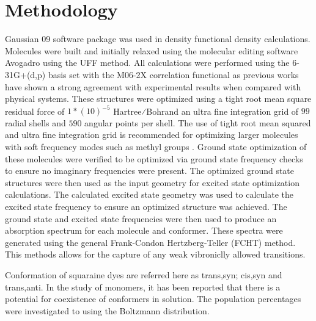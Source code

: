 \documentclass[journal=jacsat,manuscript=article]{achemso}
\begin{document}
\section{Methodology}
Gaussian 09 software package\cite{M.J.FrischG.W.Trucks2016Gaussian09}⁠ was used in density functional density calculations. Molecules were built and initially relaxed using the molecular editing software Avogadro\cite{Hanwell2012Avogadro:Platform}⁠ using the UFF\cite{Rappe1992UFFSimulations}⁠ method. All calculations were performed using the 6-31G+(d,p) basis set with the M06-2X\cite{Zhao2008TheFunction}⁠ correlation functional as previous works have shown a strong agreement with experimental results when compared with physical systems\cite{Jacquemin2016Excited-StateCC2}. These structures were optimized using a tight root mean square residual force of $1*(10)^{-5}$  Hartree⁄Bohrand an ultra fine integration grid of $99$ radial shells and $590$ angular points per shell. The use of tight root mean squared and ultra fine integration grid is recommended for optimizing larger molecules with soft frequency modes such as methyl groups\cite{AzaisTestingSuper-Resolution}⁠ . Ground state optimization of these molecules were verified to be optimized via ground state frequency checks to ensure no imaginary frequencies were present. The optimized ground state structures were then used as the input geometry for excited state optimization calculations. The calculated excited state geometry was used to calculate the excited state frequency to ensure an optimized structure was achieved.  The ground state and excited state frequencies were then used to produce an absorption spectrum for each molecule and conformer. These spectra were generated using the general Frank-Condon Hertzberg-Teller (FCHT) method. This methods allows for the capture of any weak vibroniclly allowed transitions\cite{Santoro2008EffectiveStudy}⁠.

Conformation of squaraine dyes are referred here as trans,syn; cis,syn and trans,anti. In the study of monomers, it has been reported that there is a potential for coexistence of conformers in solution\cite{Kolosova2019MolecularSquaraines}⁠. The population percentages were investigated to using the Boltzmann distribution. 
\end{document}
